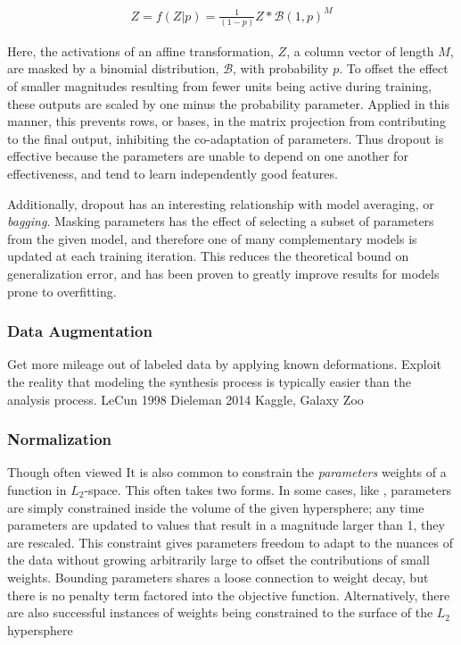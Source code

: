 \begin{align*}
Z = f(Z | p) = \frac{1}{(1 - p)} Z * \mathcal{B}(1, p)^M
\end{align*}

\noindent Here, the activations of an affine transformation, $Z$, a column vector of length $M$, are masked by a binomial distribution, $\mathcal{B}$, with probability $p$.
To offset the effect of smaller magnitudes resulting from fewer units being active during training, these outputs are scaled by one minus the probability parameter.
Applied in this manner, this prevents rows, or bases, in the matrix projection from contributing to the final output, inhibiting the co-adaptation of parameters.
Thus dropout is effective because the parameters are unable to depend on one another for effectiveness, and tend to learn independently good features.

Additionally, dropout has an interesting relationship with model averaging, or \emph{bagging}.
Masking parameters has the effect of selecting a subset of parameters from the given model, and therefore one of many complementary models is updated at each training iteration.
This reduces the theoretical bound on generalization error, and has been proven to greatly improve results for models prone to overfitting.


\subsubsection{Data Augmentation}

Get more mileage out of labeled data by applying known deformations.
Exploit the reality that modeling the synthesis process is typically easier than the analysis process.
LeCun 1998
Dieleman 2014 Kaggle, Galaxy Zoo


\subsubsection{Normalization}


Though often viewed It is also common to constrain the \emph{parameters} weights of a function in $L_2$-space.
This often takes two forms.
In some cases, like \cite{HintonDropout}, parameters are simply constrained inside the volume of the given hypersphere; any time parameters are updated to values that result in a magnitude larger than 1, they are rescaled.
This constraint gives parameters freedom to adapt to the nuances of the data without growing arbitrarily large to offset the contributions of small weights.
Bounding parameters shares a loose connection to weight decay, but there is no penalty term factored into the objective function.
Alternatively, there are also successful instances of weights being constrained to the surface of the $L_2$ hypersphere \cite{LeCun}

